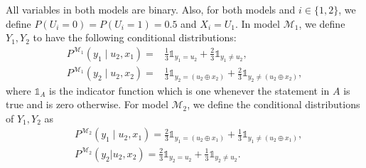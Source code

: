 \documentclass[accepted]{uai2022}
\newcommand{\M}[0]{\mathcal{M}}
\begin{document}
        All variables in both models are binary. 
        Also, for both models and $i\in \{1,2\}$, we define $P(U_i=0) = P(U_i=1) = 0.5$ and $X_i = U_1$.
        In model $\M_1$, we define $Y_1,Y_2$ to have the following conditional distributions:
        \begin{equation*}
            \begin{split}
                P^{\M_1}(y_1 \mid u_2, x_1) = &\frac{1}{3} \mathds{1}_{y_1=u_2} + \frac{2}{3}\mathds{1}_{y_1\neq u_2},
                \\
                P^{\M_1}(y_2 \mid u_2, x_2) = &\frac{1}{3} \mathds{1}_{y_2 = (u_2\oplus x_2)} + \frac{2}{3}\mathds{1}_{y_2\neq(u_2\oplus x_2)},
            \end{split}
        \end{equation*}
        where $\mathds{1}_{A}$ is the indicator function which is one whenever the statement in $A$ is true and is zero otherwise. 
        For model $\M_2$, we define the conditional distributions of $Y_1,Y_2$ as
        \begin{align*}
                &P^{\M_2}(y_1 \mid u_2, x_1) = \frac{2}{3}\mathds{1}_{y_1=(u_2\oplus x_1)} + \frac{1}{3}\mathds{1}_{y_1\neq(u_2\oplus x_1)},\\
                &P^{\M_2}(y_2|u_2, x_2) = \frac{2}{3}\mathds{1}_{y_2=u_2} + \frac{1}{3}\mathds{1}_{y_2\neq u_2}.
        \end{align*}
        
\end{document}
